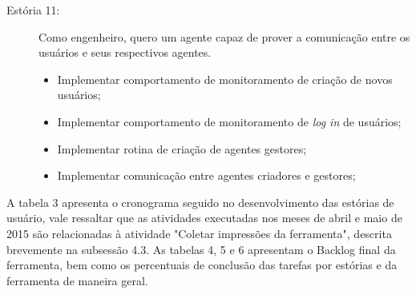 \begin{description}
\item[Estória 11:]
Como engenheiro, quero um agente capaz de prover a comunicação entre os usuários e seus respectivos agentes.

\begin{itemize}

\item Implementar comportamento de monitoramento de criação de novos usuários;
\item Implementar comportamento de monitoramento de \textit{log in} de usuários;
\item Implementar rotina de criação de agentes gestores;
\item Implementar comunicação entre agentes criadores e gestores;

\end{itemize}

\end{description}

A tabela 3 apresenta o cronograma seguido no desenvolvimento das estórias de usuário, vale ressaltar que as atividades executadas nos meses de abril e maio de 2015 são relacionadas à atividade "Coletar impressões da ferramenta", descrita brevemente na subsessão 4.3. As tabelas 4, 5 e 6 apresentam  o Backlog final da ferramenta, bem como os percentuais de conclusão das tarefas por estórias e da ferramenta de maneira geral.

